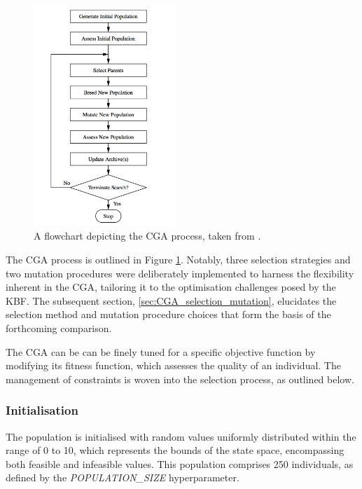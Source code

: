 \documentclass[10pt]{article}
\begin{document}
\begin{multicols}{2}
\begin{figure}[H]
    \centering
    \includegraphics[width=0.48\textwidth]{../figures/Permanent Images/Flowchart.png}
    \captionsetup{justification=centering}
    \caption{A flowchart depicting the CGA process, taken from \cite{parks2023geneticalgorithms}.}
    \label{fig:GAprocess}
\end{figure}

The CGA process is outlined in Figure \ref{fig:GAprocess}. Notably, three selection strategies and two mutation procedures were deliberately implemented to harness the flexibility inherent in the CGA, tailoring it to the optimisation challenges posed by the KBF. The subsequent section, \ref{sec:CGA_selection_mutation}, elucidates the selection method and mutation procedure choices that form the basis of the forthcoming comparison.

The CGA can be can be finely tuned for a specific objective function by modifying its fitness function, which assesses the quality of an individual. The management of constraints is woven into the selection process, as outlined below.

\subsubsection{Initialisation}

The population is initialised with random values uniformly distributed within the range of 0 to 10, which represents the bounds of the state space, encompassing both feasible and infeasible values. This population comprises 250 individuals, as defined by the \textit{POPULATION\_SIZE} hyperparameter. 


\end{multicols}
\end{document}

